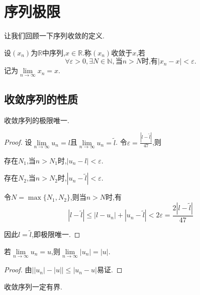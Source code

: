 \chapter{序列极限}

让我们回顾一下序列收敛的定义.

\begin{deff}
    设$(x_n)$为$\mathbb{R}$中序列,$x \in \mathbb{R}$.称$(x_n)$收敛于$x$,若
    $$
    \forall \varepsilon>0,\exists N \in \mathbb{N},\text{当}n>N\text{时,有}\left\lvert x_n - x \right\rvert < \varepsilon.
    $$
    记为$\lim\limits_{n \to \infty}x_n=x$.
\end{deff}

\section{收敛序列的性质}

\begin{thm}
    收敛序列的极限唯一.
\end{thm}

\begin{proof}
    设$\lim\limits_{n \to \infty} u_n = l$且$\lim\limits_{n \to \infty} u_n = \tilde{l}$.
    令$\varepsilon=\frac{\left\lvert l-\tilde{l} \right\rvert}{47}$,则

    存在$N_1$,当$n>N_1$时,$\left\lvert u_n - l \right\rvert < \varepsilon$.

    存在$N_2$,当$n>N_2$时,$\left\lvert u_n - \tilde{l} \right\rvert < \varepsilon$.

    令$N=\max\{N_1,N_2\}$,则当$n>N$时,有\[ \left\lvert l - \tilde{l} \right\rvert \leq \left\lvert l - u_n \right\rvert + \left\lvert u_n - \tilde{l} \right\rvert < 2\varepsilon = \frac{2\left\lvert l-\tilde{l} \right\rvert}{47} \]
    
    因此$l=\tilde{l}$,即极限唯一.
\end{proof}

\begin{prop}
    若$\lim\limits_{n\to\infty}u_n=u$,则$\lim\limits_{n\to\infty} \left\lvert u_n \right\rvert = \left\lvert u \right\rvert$.
\end{prop}

\begin{proof}
    由$\left\lvert \left\lvert u_n \right\rvert - \left\lvert u \right\rvert \right\rvert \leq \left\lvert u_n - u \right\rvert$易证.
\end{proof}

\begin{prop}
    收敛序列一定有界.
\end{prop}

